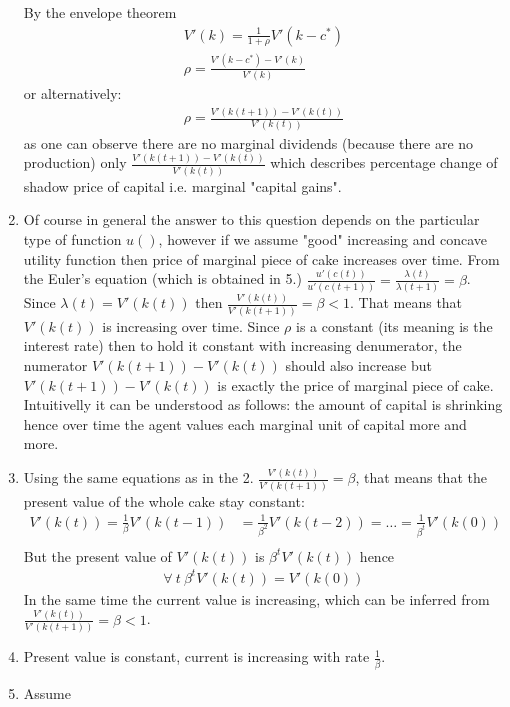 \documentclass[a4paper]{article}
\begin{document}
\begin{enumerate}
	
	By the envelope theorem
	\begin{align*}
	V'(k) = \frac{1}{1+\rho}V'(k-c^*)\\
	\rho = \frac{V'(k-c^*) - V'(k)}{V'(k)}
	\end{align*}
	or alternatively:
	\begin{align*}
	\rho = \frac{V'(k(t+1)) - V'(k(t))}{V'(k(t))}
	\end{align*}
	as one can observe there are no marginal dividends (because there are no production) only $\frac{V'(k(t+1)) - V'(k(t))}{V'(k(t))}$ which describes percentage change of shadow price of capital i.e. marginal "capital gains". 
	\item Of course in general the answer to this question depends on the particular type of function $u()$, however if we assume "good" increasing and concave utility function then price of marginal piece of cake increases over time. From the Euler's equation (which is obtained in 5.) $\frac{u'(c(t))}{u'(c(t+1))} = \frac{\lambda(t)}{\lambda(t+1)} = \beta$. Since $\lambda(t) = V'(k(t))$ then $\frac{V'(k(t))}{V'(k(t+1))} = \beta < 1$. That means that $V'(k(t))$ is increasing over time. Since $\rho$ is a constant (its meaning is the interest rate) then to hold it constant with increasing denumerator, the numerator $V'(k(t+1)) - V'(k(t))$ should also increase but $V'(k(t+1)) - V'(k(t))$ is exactly the price of marginal piece of cake. Intuitivelly it can be understood as follows: the amount of capital is shrinking hence over time the agent values each marginal unit of capital more and more. 
	\item Using the same equations as in the 2. $\frac{V'(k(t))}{V'(k(t+1))} = \beta$, that means that the present value of the whole cake stay constant: \begin{align*}
	V'(k(t)) = \frac{1}{\beta}V'(k(t-1)) &= \frac{1}{\beta^2}V'(k(t-2)) = \dots = \frac{1}{\beta^t}V'(k(0))\\
	\end{align*}
	But the present value of $V'(k(t))$ is $\beta^t V'(k(t))$ hence 
	\begin{align*}
	\forall\ t\ \beta^t V'(k(t)) = V'(k(0))
	\end{align*}
	In the same time the current value is increasing, which can be inferred from $\frac{V'(k(t))}{V'(k(t+1))} = \beta < 1$.
	\item Present value is constant, current is increasing with rate $\frac{1}{\beta}$.
	\item Assume 
	\begin{align*}

\end{align*}
\end{enumerate}
\end{document}

